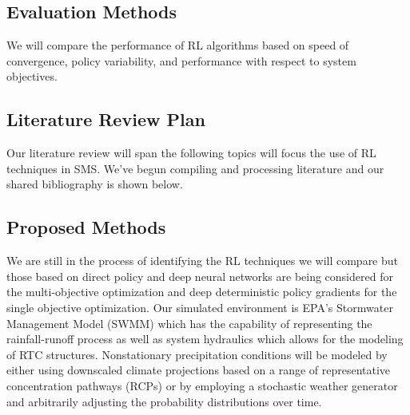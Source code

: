 \documentclass[11pt,a4paper]{article}
\begin{document}
\subsection*{Evaluation Methods}
We will compare the performance of RL algorithms based on speed of convergence, policy variability, and performance with respect to system objectives.

\subsection*{Literature Review Plan}
Our literature review will span the following topics will focus the use of RL techniques in SMS. We've begun compiling and processing literature and our shared bibliography is shown below.

\subsection*{Proposed Methods}
We are still in the process of identifying the RL techniques we will compare but those based on direct policy and deep neural networks are being considered for the multi-objective optimization and deep deterministic policy gradients for the single objective optimization. Our simulated environment is EPA's Stormwater Management Model (SWMM) which has the capability of representing the rainfall-runoff process as well as system hydraulics which allows for the modeling of RTC structures. Nonstationary precipitation conditions will be modeled by either using downscaled climate projections based on a range of representative concentration pathways (RCPs) or by employing a stochastic weather generator and arbitrarily adjusting the probability distributions over time.
\end{document}
